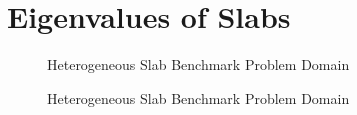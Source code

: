 \chapter{Eigenvalues of Slabs}

\begin{figure}
	\centering
	
	\label{fig:HeteroSlabDomain}
	\caption{Heterogeneous Slab Benchmark Problem Domain \cite{kornreich_timeeigenvalue_2005}}
\end{figure}

\begin{figure}
	\centering
	
	\label{fig:ThreeRegionProblem}
	\caption{Heterogeneous Slab Benchmark Problem Domain \cite{kornreich_timeeigenvalue_2005}}
\end{figure}